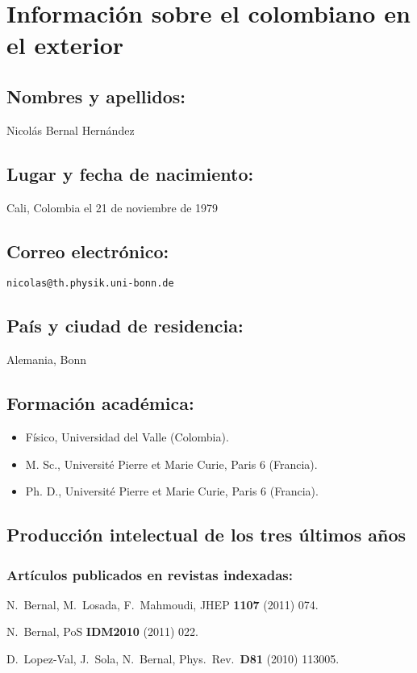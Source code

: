 \section{Información sobre el colombiano en el exterior}
\subsection{Nombres y apellidos: }
Nicolás Bernal Hernández
\subsection{Lugar y fecha de nacimiento: }
Cali, Colombia el  21 de noviembre de 1979
\subsection{Correo electrónico: }
\texttt{nicolas@th.physik.uni-bonn.de}
\subsection{País y ciudad de residencia: }
Alemania, Bonn
\subsection{Formación académica:}
\begin{itemize}
\item Físico, Universidad del Valle (Colombia).
\item M. Sc.,  Université Pierre et Marie Curie, Paris 6 (Francia).
\item Ph. D.,  Université Pierre et Marie Curie, Paris 6 (Francia).
\end{itemize}
\subsection{Producción intelectual de los tres últimos años}
\subsubsection{Artículos publicados en revistas indexadas:}
  N.~Bernal, M.~Losada, F.~Mahmoudi,
  JHEP {\bf 1107 } (2011)  074.

  N.~Bernal,
  PoS {\bf IDM2010 } (2011)  022.

  D.~Lopez-Val, J.~Sola, N.~Bernal,
  Phys.\ Rev.\  {\bf D81 } (2010)  113005.

